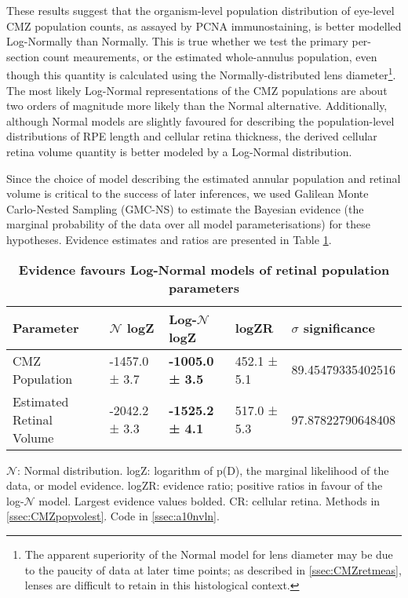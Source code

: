 These results suggest that the organism-level population distribution of eye-level CMZ population counts, as assayed by PCNA immunostaining, is better modelled Log-Normally than Normally. This is true whether we test the primary per-section count meaurements, or the estimated whole-annulus population, even though this quantity is calculated using the Normally-distributed lens diameter\footnote{The apparent superiority of the Normal model for lens diameter may be due to the paucity of data at later time points; as described in \autoref{ssec:CMZretmeas}, lenses are difficult to retain in this histological context.}. The most likely Log-Normal representations of the CMZ populations are about two orders of magnitude more likely than the Normal alternative. Additionally, although Normal models are slightly favoured for describing the population-level distributions of RPE length and cellular retina thickness, the derived cellular retina volume quantity is better modeled by a Log-Normal distribution. 

Since the choice of model describing the estimated annular population and retinal volume is critical to the success of later inferences, we used Galilean Monte Carlo-Nested Sampling (GMC-NS) to estimate the Bayesian evidence (the marginal probability of the data over all model parameterisations) for these hypotheses. Evidence estimates and ratios are presented in Table \ref{PZRtable}.

\begin{table}[!ht]
    \centering
    \caption{
    {\bf Evidence favours Log-Normal models of retinal population parameters}}
    \begin{tabular}{|l|l|l|l|l|}
    \hline
    {\bf Parameter} & {\bf $\mathcal{N}$ logZ} & {\bf Log-$\mathcal{N}$ logZ} & {\bf logZR} & {\bf $\sigma$ significance}\\ \hline
    CMZ Population & -1457.0 ± 3.7 & {\bf -1005.0 ± 3.5} & 452.1 ± 5.1 & 89.45479335402516\\ \hline
    Estimated Retinal Volume & -2042.2 ± 3.3 & {\bf -1525.2 ± 4.1} & 517.0 ± 5.3 & 97.87822790648408\\ \hline
    \end{tabular}
    \begin{flushleft} $\mathcal{N}$: Normal distribution. logZ: logarithm of p(D), the marginal likelihood of the data, or model evidence. logZR: evidence ratio; positive ratios in favour of the log-$\mathcal{N}$ model. Largest evidence values bolded. CR: cellular retina.
        Methods in \autoref{ssec:CMZpopvolest}.
        Code in \autoref{ssec:a10nvln}.
    \end{flushleft}
    \label{PZRtable}
\end{table}

